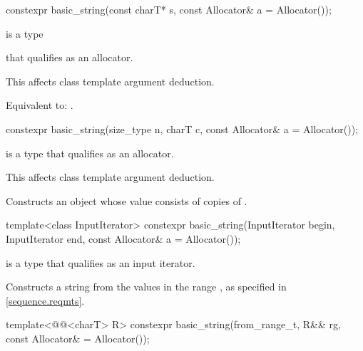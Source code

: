 %
\begin{itemdecl}
constexpr basic_string(const charT* s, const Allocator& a = Allocator());
\end{itemdecl}

\begin{itemdescr}
\pnum
\constraints
{} is a type

that qualifies as an allocator.
\begin{note}
This affects class template argument deduction.
\end{note}

\pnum
\effects
Equivalent to: .
\end{itemdescr}

%
\begin{itemdecl}
constexpr basic_string(size_type n, charT c, const Allocator& a = Allocator());
\end{itemdecl}

\begin{itemdescr}
\pnum
\constraints
{} is a type
that qualifies as an allocator.
\begin{note}
This affects class template argument deduction.
\end{note}

\pnum
\effects
Constructs an object whose value consists of  copies of .
\end{itemdescr}

%
\begin{itemdecl}
template<class InputIterator>
  constexpr basic_string(InputIterator begin, InputIterator end, const Allocator& a = Allocator());
\end{itemdecl}

\begin{itemdescr}
\pnum
\constraints
{} is a type that qualifies as an input
iterator.

\pnum
\effects
Constructs a string from the values in the range ,
as specified in \ref{sequence.reqmts}.
\end{itemdescr}

%
\begin{itemdecl}
template<@@<charT> R>
  constexpr basic_string(from_range_t, R&& rg, const Allocator& = Allocator());
\end{itemdecl}

